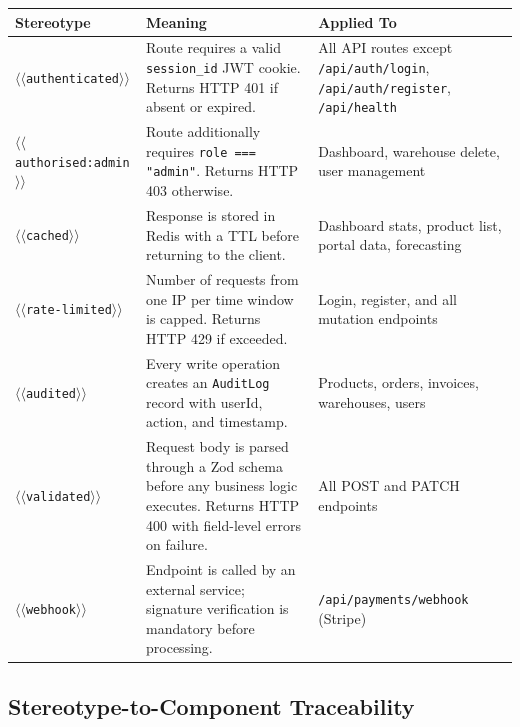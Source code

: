 \documentclass[12pt,a4paper]{report}
\begin{document}
\begin{center}
\begin{tabularx}{\textwidth}{lXX}
    \toprule
    \textbf{Stereotype} & \textbf{Meaning} & \textbf{Applied To} \\
    \midrule
    \texttt{$\langle\langle$authenticated$\rangle\rangle$} & Route requires a valid \texttt{session\_id} JWT cookie. Returns HTTP 401 if absent or expired. & All API routes except \texttt{/api/auth/login}, \texttt{/api/auth/register}, \texttt{/api/health} \\
    \texttt{$\langle\langle$authorised:admin$\rangle\rangle$} & Route additionally requires \texttt{role === "admin"}. Returns HTTP 403 otherwise. & Dashboard, warehouse delete, user management \\
    \texttt{$\langle\langle$cached$\rangle\rangle$} & Response is stored in Redis with a TTL before returning to the client. & Dashboard stats, product list, portal data, forecasting \\
    \texttt{$\langle\langle$rate-limited$\rangle\rangle$} & Number of requests from one IP per time window is capped. Returns HTTP 429 if exceeded. & Login, register, and all mutation endpoints \\
    \texttt{$\langle\langle$audited$\rangle\rangle$} & Every write operation creates an \texttt{AuditLog} record with userId, action, and timestamp. & Products, orders, invoices, warehouses, users \\
    \texttt{$\langle\langle$validated$\rangle\rangle$} & Request body is parsed through a Zod schema before any business logic executes. Returns HTTP 400 with field-level errors on failure. & All POST and PATCH endpoints \\
    \texttt{$\langle\langle$webhook$\rangle\rangle$} & Endpoint is called by an external service; signature verification is mandatory before processing. & \texttt{/api/payments/webhook} (Stripe) \\
    \bottomrule
\end{tabularx}
\end{center}

\subsection{Stereotype-to-Component Traceability}
\end{document}
